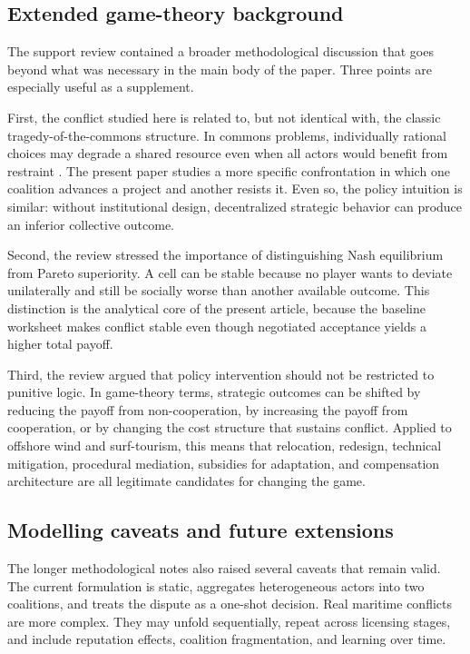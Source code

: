 \subsection{Extended game-theory background}

The support review contained a broader methodological discussion that goes beyond what was necessary in the main body of the paper. Three points are especially useful as a supplement.

First, the conflict studied here is related to, but not identical with, the classic tragedy-of-the-commons structure. In commons problems, individually rational choices may degrade a shared resource even when all actors would benefit from restraint \citep{hardin1968tragedy,ostrom_2015}. The present paper studies a more specific confrontation in which one coalition advances a project and another resists it. Even so, the policy intuition is similar: without institutional design, decentralized strategic behavior can produce an inferior collective outcome.

Second, the review stressed the importance of distinguishing Nash equilibrium from Pareto superiority. A cell can be stable because no player wants to deviate unilaterally and still be socially worse than another available outcome. This distinction is the analytical core of the present article, because the baseline worksheet makes conflict stable even though negotiated acceptance yields a higher total payoff.

Third, the review argued that policy intervention should not be restricted to punitive logic. In game-theory terms, strategic outcomes can be shifted by reducing the payoff from non-cooperation, by increasing the payoff from cooperation, or by changing the cost structure that sustains conflict. Applied to offshore wind and surf-tourism, this means that relocation, redesign, technical mitigation, procedural mediation, subsidies for adaptation, and compensation architecture are all legitimate candidates for changing the game.

\subsection{Modelling caveats and future extensions}

The longer methodological notes also raised several caveats that remain valid. The current formulation is static, aggregates heterogeneous actors into two coalitions, and treats the dispute as a one-shot decision. Real maritime conflicts are more complex. They may unfold sequentially, repeat across licensing stages, and include reputation effects, coalition fragmentation, and learning over time.

